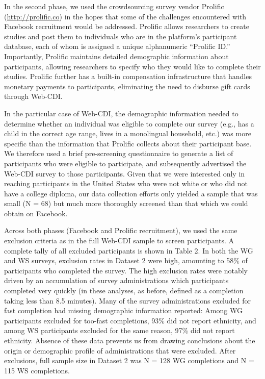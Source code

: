 \documentclass[
  english,
  ,man,floatsintext]{apa6}
\begin{document}
In the second phase, we used the crowdsourcing survey vendor Prolific (\url{http://prolific.co}) in the hopes that some of the challenges encountered with Facebook recruitment would be addressed. Prolific allows researchers to create studies and post them to individuals who are in the platform's participant database, each of whom is assigned a unique alphanumeric ``Prolific ID.'' Importantly, Prolific maintains detailed demographic information about participants, allowing researchers to specify who they would like to complete their studies. Prolific further has a built-in compensation infrastructure that handles monetary payments to participants, eliminating the need to disburse gift cards through Web-CDI.

In the particular case of Web-CDI, the demographic information needed to determine whether an individual was eligible to complete our survey (e.g., has a child in the correct age range, lives in a monolingual household, etc.) was more specific than the information that Prolific collects about their participant base. We therefore used a brief pre-screening questionnaire to generate a list of participants who were eligible to participate, and subsequently advertised the Web-CDI survey to those participants. Given that we were interested only in reaching participants in the United States who were not white or who did not have a college diploma, our data collection efforts only yielded a sample that was small (N = 68) but much more thoroughly screened than that which we could obtain on Facebook.

Across both phases (Facebook and Prolific recruitment), we used the same exclusion criteria as in the full Web-CDI sample to screen participants. A complete tally of all excluded participants is shown in Table 2. In both the WG and WS surveys, exclusion rates in Dataset 2 were high, amounting to 58\% of participants who completed the survey. The high exclusion rates were notably driven by an accumulation of survey administrations which participants completed very quickly (in these analyses, as before, defined as a completion taking less than 8.5 minutes). Many of the survey administrations excluded for fast completion had missing demographic information reported: Among WG participants excluded for too-fast completions, 93\% did not report ethnicity, and among WS participants excluded for the same reason, 97\% did not report ethnicity. Absence of these data prevents us from drawing conclusions about the origin or demographic profile of administrations that were excluded. After exclusions, full sample size in Dataset 2 was N = 128 WG completions and N = 115 WS completions.
\end{document}
